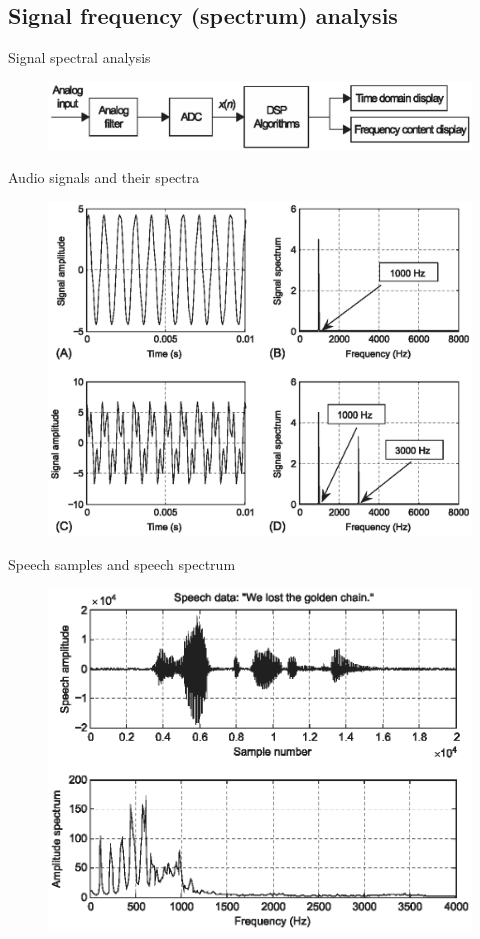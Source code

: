 \documentclass[pdflatex,compress,mathserif]{beamer}
\begin{document}
\subsection{Signal frequency (spectrum) analysis}

\begin{frame}{Signal spectral analysis}
	\begin{figure}
		\includegraphics[width=\linewidth]{img/img04}
	\end{figure}
\end{frame}

\begin{frame}{Audio signals and their spectra}
	\begin{figure}
		\includegraphics[width=0.8\linewidth]{img/img05}
	\end{figure}
\end{frame}

\begin{frame}{Speech samples and speech spectrum}
	\begin{figure}
		\includegraphics[width=0.8\linewidth]{img/img06}
	\end{figure}
\end{frame}
\end{document}
